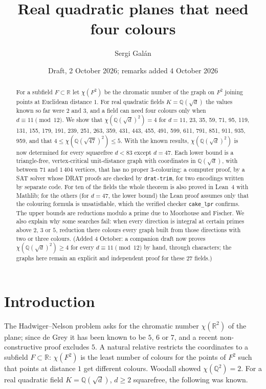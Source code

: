 \documentclass[11pt,a4paper]{amsart}
\title{Real quadratic planes that need four colours}
\author{Sergi Gal\'an}
\date{Draft, 2 October 2026; remarks added 4 October 2026}
\theoremstyle{remark}
\newcommand{\Q}{\mathbb{Q}}
\newcommand{\R}{\mathbb{R}}
\begin{document}
\begin{abstract}
For a subfield $F\subset\R$ let $\chi(F^2)$ be the chromatic number of the graph on $F^2$ joining points at
Euclidean distance $1$. For real quadratic fields $K=\Q(\sqrt d)$ the values known so far were $2$ and $3$, and
a field can need four colours only when $d\equiv 11\pmod{12}$. We show that
$\chi(\Q(\sqrt d)^2)=4$ for $d=11$, 23, 35, 59, 71, 95, 119, 131, 155, 179, 191, 239, 251, 263, 359, 431, 443, 455, 491, 599,
611, 791, 851, 911, 935, 959, and that
$4\le\chi(\Q(\sqrt{47})^2)\le5$. With the known results, $\chi(\Q(\sqrt d)^2)$ is now determined for every
squarefree $d<83$ except $d=47$. Each lower bound is a triangle-free, vertex-critical unit-distance graph with
coordinates in $\Q(\sqrt d)$, with between $71$ and $1\,404$ vertices, that has no proper $3$-colouring: a computer
proof, by a SAT solver whose DRAT proofs are checked by \texttt{drat-trim}, for two encodings written by
separate code. For ten of the fields the whole theorem is also proved in Lean~4 with Mathlib; for the others
(for $d=47$, the lower bound) the Lean proof assumes only that the colouring formula is unsatisfiable, which
the verified checker \texttt{cake\_lpr} confirms. The upper bounds are reductions modulo a prime due to Moorhouse and Fischer. We also explain why
some searches fail: when every direction is integral at certain primes above $2$, $3$ or $5$, reduction there
colours every graph built from those directions with two or three colours. (Added 4 October: a companion draft
now proves $\chi(\Q(\sqrt d)^2)\ge4$ for every $d\equiv11\pmod{12}$ by hand, through characters; the graphs here
remain an explicit and independent proof for these $27$ fields.)
\end{abstract}

\maketitle

\section{Introduction}

The Hadwiger--Nelson problem asks for the chromatic number $\chi(\R^2)$ of the plane; since de Grey
\cite{deGrey} it has been known to be $5$, $6$ or $7$, and a recent non-constructive proof \cite{OpenAI}
excludes $5$. A natural relative restricts the coordinates to a subfield
$F\subset\R$: $\chi(F^2)$ is the least number of colours for the points of $F^2$ such that points at distance
$1$ get different colours. Woodall \cite{Woodall} showed $\chi(\Q^2)=2$. For a real quadratic field
$K=\Q(\sqrt d)$, $d\ge2$ squarefree, the following was known.
\end{document}

